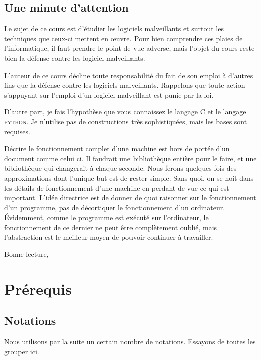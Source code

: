 \documentclass{book}
\newcommand{\python}{\textsc{python}\xspace}
\newcommand{\C}{\textsc{C}\xspace}
\begin{document}
	
\section*{Une minute d'attention}

Le sujet de ce cours est d'étudier les logiciels malveillants et surtout les techniques que ceux-ci mettent en \oe uvre. Pour bien comprendre ces plaies de l'informatique, il faut prendre le point de vue adverse, mais l'objet du cours reste bien la défense contre les logiciel malveillants. 

L'auteur de ce cours décline toute responsabilité du fait de son emploi à d'autres fins que la défense contre les logiciels malveillants. Rappelons que toute action s'appuyant sur l'emploi d'un logiciel malveillant est punie par la loi. 

D'autre part, je fais l'hypothèse que vous connaissez le langage \C et le langage \python. Je n'utilise pas de constructions très sophistiquées, mais les bases sont requises.

Décrire le fonctionnement complet d'une machine est hors de portée d'un document comme celui ci. Il faudrait une bibliothèque entière pour le faire, et une bibliothèque qui changerait à chaque seconde. Nous ferons  quelques fois des approximations dont l'unique but est de rester simple. Sans quoi, on se noit dans les détails de fonctionnement d'une machine en perdant de vue ce qui est important. L'idée directrice est de donner de quoi raisonner sur le fonctionnement d'un programme, pas de décortiquer le fonctionnement d'un ordinateur. \'Evidemment, comme le programme est exécuté sur l'ordinateur, le fonctionnement de ce dernier ne peut être complètement oublié, mais l'abstraction est le meilleur moyen de pouvoir continuer à travailler.

\medskip
Bonne lecture,

\chapter{Prérequis}

\section{Notations}

Nous utilisons par la suite un certain nombre de notations. Essayons de toutes les grouper ici.

\end{document}
